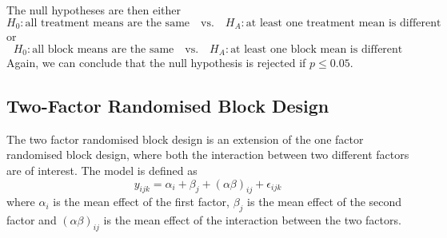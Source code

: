 \documentclass{article}
\begin{document}
The null hypotheses are then either
\begin{equation*}
    H_0 : \text{all treatment means are the same} \quad \text{vs.} \quad H_A : \text{at least one treatment mean is different}
\end{equation*}
or
\begin{equation*}
    H_0 : \text{all block means are the same} \quad \text{vs.} \quad H_A : \text{at least one block mean is different}
\end{equation*}
Again, we can conclude that the null hypothesis is rejected if \(p \leq 0.05\).
\subsection{Two-Factor Randomised Block Design}
The two factor randomised block design is an extension of the one factor randomised block design, where
both the interaction between two different factors are of interest. The model is defined as
\begin{equation*}
    y_{ijk} = \alpha_i + \beta_j + \left( \alpha \beta \right)_{ij} + \epsilon_{ijk}
\end{equation*}
where \(\alpha_i\) is the mean effect of the first factor, \(\beta_j\) is the mean effect of the second
factor and \(\left( \alpha \beta \right)_{ij}\) is the mean effect of the interaction between the two factors.
\end{document}
